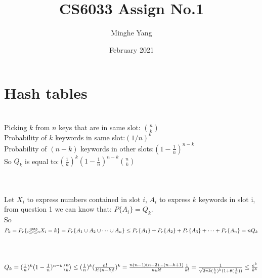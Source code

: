 \documentclass{article}
\title{CS6033 Assign No.1}
\author{Minghe Yang }
\date{February 2021}
\begin{document}
\renewcommand{\algorithmicrequire}{\textbf{Input:}} 
\renewcommand{\algorithmicensure}{\textbf{Output:}}
\maketitle

\section{Hash tables}

\\
Picking $k$ from $n$ keys that are in same slot: $\binom{n}{k}$
\\
Probability of $k$ keywords in same slot:$(1/n)^k$
\\
Probability of $(n-k)$ keywords in other slots:$(1-\frac{1}{n})^{n-k}$
\\
So $Q_k$ is equal to:$(\frac{1}{n})^k(1-\frac{1}{n})^{n-k}\binom{n}{k}$
\\\\
\\Let $X_i$ to express numbers contained in slot $i$, $A_i$ to express $k$ keywords in slot i,
from question 1 we can know that: $P\{A_i\}=Q_k$.
\\So $P_k=P_r\{\substack{\max\\i\leq i\leq n}X_i=k\}=P_r\{A_1\cup A_2\cup\dots\cup A_n\}
\\\leq P_r\{A_1\}+P_r\{A_2\}+P_r\{A_3\}+\dots+P_r\{A_n\}=nQ_k$ 
\\\\
\\$Q_k=(\frac{1}{n})^k(1-\frac{1}{n})^{n-k}\binom{n}{k}\leq 
(\frac{1}{n})^k(\frac{n!}{k!(n-k)!})^k=\frac{n(n-1)(n-2)\dots(n-k+1)}{n_kk!}
\\\frac{1}{k!}=\frac{1}{\sqrt{2\pi k}(\frac{k}{e})^k(1+\theta(\frac{1}{n}))}
\leq \frac{e^k}{k^k}$
\\\\
\end{document}

